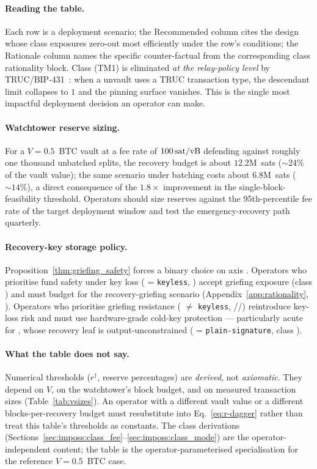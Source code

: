 \paragraph{Reading the table.} Each row is a deployment scenario; the
Recommended column cites the design whose class exposures zero-out
most efficiently under the row's conditions; the Rationale column
names the specific counter-factual from the corresponding class
rationality block. Class \classfee{} (TM1) is eliminated \emph{at the
relay-policy level} by TRUC/BIP-431~\cite{TRUC}: when a \opctv{}
unvault uses a TRUC transaction type, the descendant limit collapses
to $1$ and the pinning surface vanishes. This is the single most
impactful deployment decision an \opctv{} operator can make.

\paragraph{Watchtower reserve sizing.}
For a $V = 0.5$~BTC vault at a fee rate of $100\text{\,sat/vB}{}$ defending
against roughly one thousand unbatched \opccv{} splits, the recovery
budget is about $12.2$M~sats (${\sim}24\%$ of the vault value); the
same scenario under batching costs about $6.8$M~sats
(${\sim}14\%$), a direct consequence of the $1.8\times$
improvement in the single-block-feasibility threshold. Operators
should size reserves against the 95th-percentile fee rate of the
target deployment window and test the emergency-recovery path
quarterly.

\paragraph{Recovery-key storage policy.}
Proposition~\ref{thm:griefing_safety} forces a binary choice on axis
\axauth{}. Operators who prioritise fund safety under key loss
(\axauth{} = \texttt{keyless}, \opccv{}) accept griefing exposure
(class \classgrief{}) and must budget for the recovery-griefing
scenario (Appendix~\ref{app:rationality}, \classgrief{}). Operators
who prioritise griefing resistance (\axauth{} $\neq$
\texttt{keyless}, \opctv{}/\opvault{}/\catcsfs{}) reintroduce
key-loss risk and must use hardware-grade cold-key protection ---
particularly acute for \catcsfs{}, whose recovery leaf is
output-unconstrained (\axrecbind{} = \texttt{plain-signature},
class \classcold{}).

\paragraph{What the table does not say.}
Numerical thresholds ($r^\dagger$, reserve percentages) are
\emph{derived}, not \emph{axiomatic}. They depend on $V$, on the
watchtower's block budget, and on measured transaction sizes
(Table~\ref{tab:vsizes}). An operator with a different vault value
or a different blocks-per-recovery budget must resubstitute into
Eq.~\ref{eq:r-dagger} rather than treat this table's thresholds as
constants. The class derivations
(Sections~\ref{sec:imposs:class_fee}--\ref{sec:imposs:class_mode})
are the operator-independent content; the table is the
operator-parameterised specialisation for the reference
$V = 0.5$~BTC case.

\providecommand{\todo}[2][]{\textbf{[TODO: #2]}}
